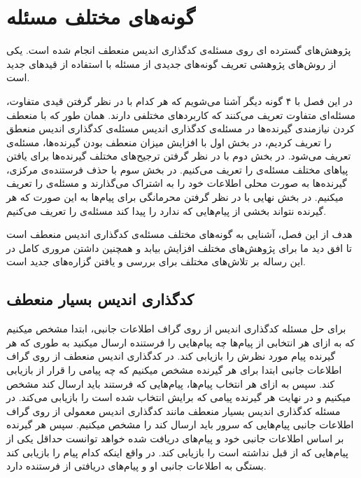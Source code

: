 
\chapter{
    گونه‌های مختلف مسئله
}
\label{chapter:varients}
پژوهش‌های گسترده ای روی مسئله‌ی کدگذاری اندیس منعطف انجام شده است. یکی از روش‌های پژوهشی تعریف گونه‌های جدیدی از مسئله با استفاده از قیدهای جدید است.

در این فصل با ۴ گونه دیگر آشنا می‌شویم که هر کدام با در نظر گرفتن قیدی متفاوت، مسئله‌ای متفاوت تعریف می‌کنند که کاربردهای مختلفی دارند. همان طور که با منعطف کردن نیازمندی گیرنده‌ها در مسئله‌ی کدگذاری اندیس مسئله‌ی کدگذاری اندیس منعطق را تعریف کردیم، در بخش اول با افزایش میزان منعطف بودن گیرنده‌ها، مسئله‌ی 
 تعریف می‌شود. در بخش دوم با در نظر گرفتن ترجیح‌های مختلف گیرنده‌ها برای یافتن پیا‌های مختلف مسئله‌ی
 را تعریف می‌کنیم. در بخش سوم با حذف فرستنده‌ی مرکزی، گیرنده‌ها به صورت محلی اطلاعات خود را به اشتراک می‌گذارند و مسئله‌ی
 را تعریف میکنیم. در بخش نهایی با در نظر گرفتن محرمانگی برای پیام‌ها به این صورت که هر گیرنده نتواند بخشی از پیام‌هایی که ندارد را پیدا کند مسئله‌ی
 را تعریف می‌کنیم.
 
 هدف از این فصل، آشنایی به گونه‌های مختلف مسئله‌ی کدگذاری اندیس منعطف است تا افق دید ما برای پژوهش‌های مختلف افزایش بیابد و همچنین داشتن مروری کامل در این رساله بر تلاش‌های مختلف برای بررسی و یافتن گزاره‌های جدید است.

\section{کدگذاری اندیس بسیار منعطف}
\label{sec:verypliable}
برای حل مسئله کدگذاری اندیس از روی گراف اطلاعات جانبی، ابتدا مشخص میکنیم که به ازای هر انتخابی از پیام‌ها چه پیام‌هایی را فرستنده ارسال میکنید به طوری که هر گیرنده پیام مورد نظرش را بازیابی کند. در کدگذاری اندیس منعطف از روی گراف اطلاعات جانبی ابتدا برای هر گیرنده مشخص میکنیم که چه پیامی را قرار از بازیابی کند. سپس به ازای هر انتخاب پیام‌ها، پیام‌هایی که فرستند باید ارسال کند مشخص میکنیم و در نهایت هر گیرنده پیامی که برایش انتخاب شده است را بازیابی می‌کند. در مسئله کدگذاری اندیس بسیار منعطف مانند کدگذاری اندیس معمولی از روی گراف اطلاعات جانبی پیام‌هایی که سرور باید ارسال کند را مشخص میکنیم. سپس هر گیرنده بر اساس اطلاعات جانبی خود و پیام‌های دریافت شده خواهد توانست حداقل یکی از پیام‌هایی که از قبل نداشته است را بازیابی کند. در واقع اینکه کدام پیام را بازیابی کند بستگی به اطلاعات جانبی او و پیام‌های دریافتی از فرستنده دارد.

